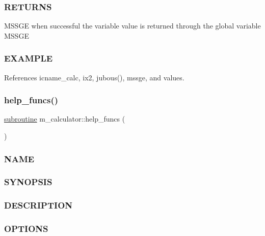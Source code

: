  \subsubsection*{R\+E\+T\+U\+R\+NS}

M\+S\+S\+GE when successful the variable value is returned through the global variable M\+S\+S\+GE

\subsubsection*{E\+X\+A\+M\+P\+LE}

References icname\+\_\+calc, ix2, jubous(), mssge, and values.

\mbox{\label{namespacem__calculator_a190e152c2fc309d59e75ee4645e6d261}} 
\subsubsection{\texorpdfstring{help\+\_\+funcs()}{help\_funcs()}}
{\footnotesize\ttfamily \hyperlink{M__stopwatch_83_8txt_acfbcff50169d691ff02d4a123ed70482}{subroutine} m\+\_\+calculator\+::help\+\_\+funcs (\begin{DoxyParamCaption}{ }\end{DoxyParamCaption})\hspace{0.3cm}{\ttfamily [private]}}



\subsubsection*{N\+A\+ME}

\subsubsection*{S\+Y\+N\+O\+P\+S\+IS}

\subsubsection*{D\+E\+S\+C\+R\+I\+P\+T\+I\+ON}

\subsubsection*{O\+P\+T\+I\+O\+NS}

